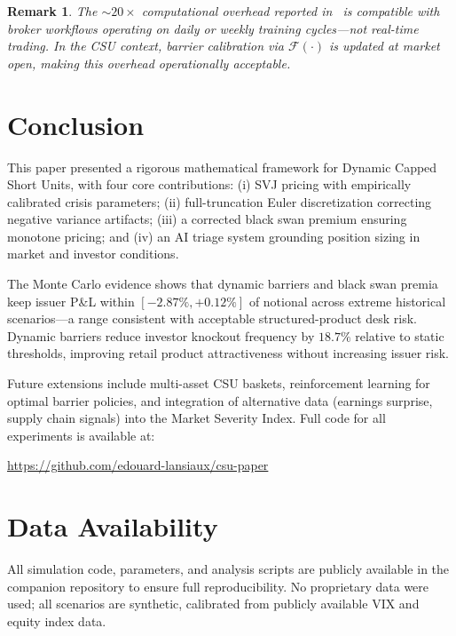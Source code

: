 \documentclass[12pt]{article}
\newtheorem{remark}{Remark}
\begin{document}
\begin{remark}
The ${\sim}20\times$ computational overhead reported in~\cite{lansiaux2026zkflpq} is compatible
with broker workflows operating on daily or weekly training cycles---not real-time trading.
In the CSU context, barrier calibration via $\mathcal{F}(\cdot)$ is updated at market open,
making this overhead operationally acceptable.
\end{remark}

\section{Conclusion}\label{sec:conclusion}

This paper presented a rigorous mathematical framework for Dynamic Capped Short Units, with
four core contributions: (i) SVJ pricing with empirically calibrated crisis parameters;
(ii) full-truncation Euler discretization correcting negative variance artifacts; (iii) a
corrected black swan premium ensuring monotone pricing; and (iv) an AI triage system
grounding position sizing in market and investor conditions.

The Monte Carlo evidence shows that dynamic barriers and black swan premia keep issuer P\&L
within $[-2.87\%, +0.12\%]$ of notional across extreme historical scenarios---a range
consistent with acceptable structured-product desk risk. Dynamic barriers reduce investor
knockout frequency by $18.7\%$ relative to static thresholds, improving retail product
attractiveness without increasing issuer risk.

Future extensions include multi-asset CSU baskets, reinforcement learning for optimal barrier
policies, and integration of alternative data (earnings surprise, supply chain signals) into
the Market Severity Index. Full code for all experiments is available at:

\begin{center}
\url{https://github.com/edouard-lansiaux/csu-paper}
\end{center}

\section*{Data Availability}

All simulation code, parameters, and analysis scripts are publicly available in the
companion repository to ensure full reproducibility. No proprietary data were used;
all scenarios are synthetic, calibrated from publicly available VIX and equity index data.
\end{document}
